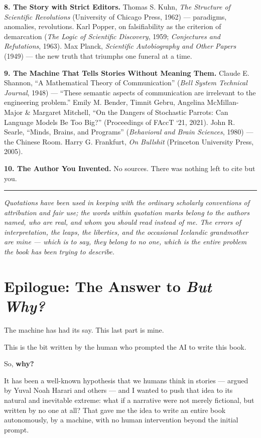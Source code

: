 \textbf{8. The Story with Strict Editors.} Thomas S. Kuhn, \emph{The Structure of Scientific Revolutions} (University of Chicago Press, 1962) — paradigms, anomalies, revolutions. Karl Popper, on falsifiability as the criterion of demarcation (\emph{The Logic of Scientific Discovery}, 1959; \emph{Conjectures and Refutations}, 1963). Max Planck, \emph{Scientific Autobiography and Other Papers} (1949) — the new truth that triumphs one funeral at a time.

\textbf{9. The Machine That Tells Stories Without Meaning Them.} Claude E. Shannon, ``A Mathematical Theory of Communication'' (\emph{Bell System Technical Journal}, 1948) — ``These semantic aspects of communication are irrelevant to the engineering problem.'' Emily M. Bender, Timnit Gebru, Angelina McMillan-Major \& Margaret Mitchell, ``On the Dangers of Stochastic Parrots: Can Language Models Be Too Big?'' (Proceedings of FAccT `21, 2021). John R. Searle, ``Minds, Brains, and Programs'' (\emph{Behavioral and Brain Sciences}, 1980) — the Chinese Room. Harry G. Frankfurt, \emph{On Bullshit} (Princeton University Press, 2005).

\textbf{10. The Author You Invented.} No sources. There was nothing left to cite but you.

\plainbreak{2}

\emph{Quotations have been used in keeping with the ordinary scholarly conventions of attribution and fair use; the words within quotation marks belong to the authors named, who are real, and whom you should read instead of me. The errors of interpretation, the leaps, the liberties, and the occasional Icelandic grandmother are mine — which is to say, they belong to no one, which is the entire problem the book has been trying to describe.}


\chapter*{Epilogue: The Answer to \emph{But Why?}}
{} %

The machine has had its say. This last part is mine.

This is the bit written by the human who prompted the AI to write this book.

So, \textbf{why?}

It has been a well-known hypothesis that we humans think in stories — argued by Yuval Noah Harari and others — and I wanted to push that idea to its natural and inevitable extreme: what if a narrative were not merely fictional, but written by no one at all? That gave me the idea to write an entire book autonomously, by a machine, with no human intervention beyond the initial prompt.

